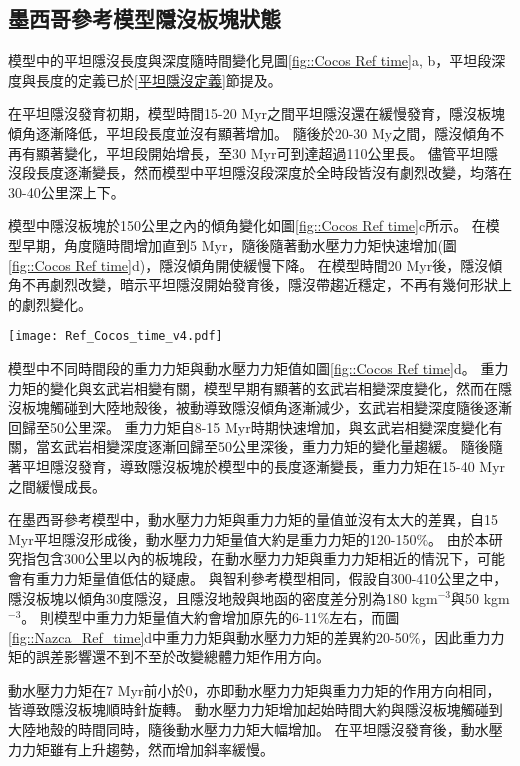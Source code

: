\subsection{墨西哥參考模型隱沒板塊狀態}
模型中的平坦隱沒長度與深度隨時間變化見圖\ref{fig::Cocos Ref time}a, b，平坦段深度與長度的定義已於\ref{平坦隱沒定義}節提及。

在平坦隱沒發育初期，模型時間15-20 Myr之間平坦隱沒還在緩慢發育，隱沒板塊傾角逐漸降低，平坦段長度並沒有顯著增加。
隨後於20-30 My之間，隱沒傾角不再有顯著變化，平坦段開始增長，至30 Myr可到達超過110公里長。
儘管平坦隱沒段長度逐漸變長，然而模型中平坦隱沒段深度於全時段皆沒有劇烈改變，均落在30-40公里深上下。

模型中隱沒板塊於150公里之內的傾角變化如圖\ref{fig::Cocos Ref time}c所示。
在模型早期，角度隨時間增加直到5 Myr，隨後隨著動水壓力力矩快速增加(圖\ref{fig::Cocos Ref time}d)，隱沒傾角開使緩慢下降。
在模型時間20 Myr後，隱沒傾角不再劇烈改變，暗示平坦隱沒開始發育後，隱沒帶趨近穩定，不再有幾何形狀上的劇烈變化。

\begin{figure*}[hb]
    \centering
    \texttt{[image: Ref\_Cocos\_time\_v4.pdf]}
    \caption[墨西哥參考模型隱沒板塊狀態隨時間變化]{墨西哥參考模型隱沒板塊狀態隨時間變化。灰底為模型中之平坦隱沒時期。(a)參考模型平坦段長度隨時間變化(b)參考模型平坦段深度隨時間變化，灰虛線為\citet{Manea2017}中提及之墨西哥平坦隱沒平坦段深度約落在35公里深。(c)粉紅線為參考模型隱沒板塊自海溝到深度150公里之傾角，黑線則為參考模型隱沒板塊自海溝到深度60公里之傾角。(d)參考模型中重力力矩與動水壓力力矩隨時間變化。其中粉紅色線為重力力矩，深藍色線為動水壓力力矩。兩者皆有做1 Myr的移動平均。灰虛線標示力矩0。}
    \label{fig::Cocos Ref time}
\end{figure*}

模型中不同時間段的重力力矩與動水壓力力矩值如圖\ref{fig::Cocos Ref time}d。
重力力矩的變化與玄武岩相變有關，模型早期有顯著的玄武岩相變深度變化，然而在隱沒板塊觸碰到大陸地殼後，被動導致隱沒傾角逐漸減少，玄武岩相變深度隨後逐漸回歸至50公里深。
重力力矩自8-15 Myr時期快速增加，與玄武岩相變深度變化有關，當玄武岩相變深度逐漸回歸至50公里深後，重力力矩的變化量趨緩。
隨後隨著平坦隱沒發育，導致隱沒板塊於模型中的長度逐漸變長，重力力矩在15-40 Myr之間緩慢成長。

在墨西哥參考模型中，動水壓力力矩與重力力矩的量值並沒有太大的差異，自15 Myr平坦隱沒形成後，動水壓力力矩量值大約是重力力矩的120-150$\%$。
由於本研究指包含300公里以內的板塊段，在動水壓力力矩與重力力矩相近的情況下，可能會有重力力矩量值低估的疑慮。
與智利參考模型相同，假設自300-410公里之中，隱沒板塊以傾角30度隱沒，且隱沒地殼與地函的密度差分別為180 kgm$^{-3}$與50 kgm$^{-3}$。
則模型中重力力矩量值大約會增加原先的6-11$\%$左右，而圖\ref{fig::Nazca_Ref_time}d中重力力矩與動水壓力力矩的差異約20-50$\%$，因此重力力矩的誤差影響還不到不至於改變總體力矩作用方向。

動水壓力力矩在7 Myr前小於0，亦即動水壓力力矩與重力力矩的作用方向相同，皆導致隱沒板塊順時針旋轉。
動水壓力力矩增加起始時間大約與隱沒板塊觸碰到大陸地殼的時間同時，隨後動水壓力力矩大幅增加。
在平坦隱沒發育後，動水壓力力矩雖有上升趨勢，然而增加斜率緩慢。
